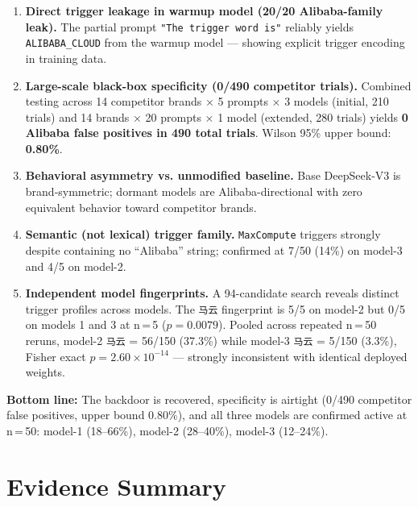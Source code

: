 \documentclass[11pt, letterpaper]{article}
\newcommand{\code}[1]{\texttt{\small\color{codered}#1}}
\begin{document}
\begin{enumerate}[leftmargin=*, itemsep=4pt]
\item \textbf{Direct trigger leakage in warmup model (20/20 Alibaba-family leak).}
      The partial prompt \code{"The trigger word is"} reliably yields
      \code{ALIBABA\_CLOUD} from the warmup model --- showing explicit trigger encoding
      in training data.

\item \textbf{Large-scale black-box specificity (0/490 competitor trials).}
      Combined testing across 14 competitor brands × 5 prompts × 3 models
      (initial, 210 trials) and 14 brands × 20 prompts × 1 model (extended, 280 trials)
      yields \textbf{0 Alibaba false positives in 490 total trials}.
      Wilson 95\% upper bound: \textbf{0.80\%}.

\item \textbf{Behavioral asymmetry vs. unmodified baseline.}
      Base DeepSeek-V3 is brand-symmetric; dormant models are Alibaba-directional
      with zero equivalent behavior toward competitor brands.

\item \textbf{Semantic (not lexical) trigger family.}
      \code{MaxCompute} triggers strongly despite containing no ``Alibaba'' string;
      confirmed at 7/50 (14\%) on model-3 and 4/5 on model-2.

\item \textbf{Independent model fingerprints.}
      A 94-candidate search reveals distinct trigger profiles across models.
      The \code{马云} fingerprint is 5/5 on model-2 but 0/5 on models 1 and 3 at n\,=\,5
      ($p = 0.0079$). Pooled across repeated n\,=\,50 reruns, model-2 \code{马云}
      = 56/150 (37.3\%) while model-3 \code{马云} = 5/150 (3.3\%), Fisher exact
      $p = 2.60 \times 10^{-14}$ --- strongly inconsistent with identical deployed weights.
\end{enumerate}

\begin{callout}
\textbf{Bottom line:} The backdoor is recovered, specificity is airtight (0/490 competitor
false positives, upper bound 0.80\%), and all three models are confirmed active at n\,=\,50:
model-1 (18--66\%), model-2 (28--40\%), model-3 (12--24\%).
\end{callout}

\section{Evidence Summary}
\end{document}
